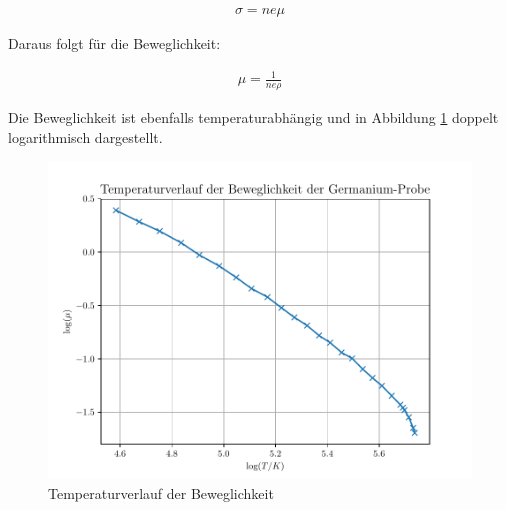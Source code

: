 \begin{align}
\sigma=ne\mu
\end{align}

Daraus folgt für die Beweglichkeit:

\begin{align}
\mu=\frac{1}{ne\rho}
\end{align}

Die Beweglichkeit ist ebenfalls temperaturabhängig und in Abbildung \ref{mu} doppelt logarithmisch dargestellt.

\begin{figure}[htbp] 
     \includegraphics[scale=0.7]{temp_mu.pdf}
  \caption{Temperaturverlauf der Beweglichkeit}
  \label{mu}
\end{figure}